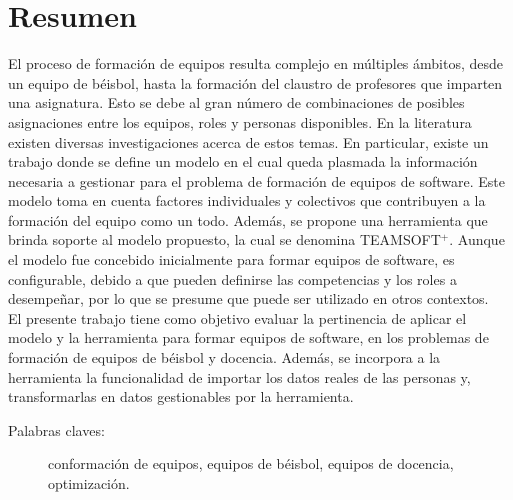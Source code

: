 \section*{Resumen}
El proceso de formación de equipos resulta complejo en múltiples ámbitos, desde un equipo de béisbol, hasta la formación del claustro de profesores que imparten una asignatura. Esto se debe al gran número de combinaciones de posibles asignaciones entre los equipos, roles y personas disponibles. En la literatura existen diversas investigaciones acerca de estos temas. En particular, existe un trabajo donde se define un modelo en el cual queda plasmada la información necesaria a gestionar para el problema de formación de equipos de software. Este modelo toma en cuenta factores individuales y colectivos que contribuyen a la formación del equipo como un todo. Además, se propone una herramienta que brinda soporte al modelo propuesto, la cual se denomina TEAMSOFT$^+$. Aunque el modelo fue concebido inicialmente para formar equipos de software, es configurable, debido a que pueden definirse las competencias y los roles a desempeñar, por lo que se presume que puede ser utilizado en otros contextos.\\

El presente trabajo tiene como objetivo evaluar la pertinencia de aplicar el modelo y la herramienta para formar equipos de software, en los problemas de formación de equipos de béisbol y docencia. Además, se incorpora a la herramienta la funcionalidad de importar los datos reales de las personas y, transformarlas en datos gestionables por la herramienta.

\begin{description}
	\item[Palabras claves:]{conformación de equipos, equipos de béisbol, equipos de docencia, optimización.}
\end{description}



